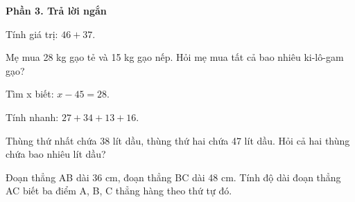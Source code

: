 \textbf{Phần 3. Trả lời ngắn}

\begin{ex} %
Tính giá trị: $46 + 37$.
\end{ex}

\begin{ex} %
Mẹ mua 28 kg gạo tẻ và 15 kg gạo nếp. Hỏi mẹ mua tất cả bao nhiêu ki-lô-gam gạo?
\end{ex}

\begin{ex} %
Tìm x biết: $x - 45 = 28$.
\end{ex}

\begin{ex} %
Tính nhanh: $27 + 34 + 13 + 16$.
\end{ex}

\begin{ex} %
Thùng thứ nhất chứa 38 lít dầu, thùng thứ hai chứa 47 lít dầu. Hỏi cả hai thùng chứa bao nhiêu lít dầu?
\end{ex}

\begin{ex} %
Đoạn thẳng AB dài 36 cm, đoạn thẳng BC dài 48 cm. Tính độ dài đoạn thẳng AC biết ba điểm A, B, C thẳng hàng theo thứ tự đó.
\end{ex}

